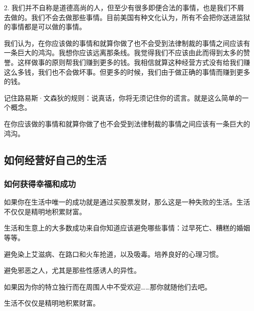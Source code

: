 2. 我们并不自称是道德高尚的人，但至少有很多即便合法的事情，也是我们不屑去做的。我们不会去做那些事情。目前美国有种文化认为，所有不会把你送进监狱的事情都是可以做的事情。
\par

我们认为，在你应该做的事情和就算你做了也不会受到法律制裁的事情之间应该有一条巨大的鸿沟。我想你应该远离那条线。我觉得我们不应该由此而得到太多的赞誉。这样做事的原则帮我们赚到更多的钱。我相信就算这种经营方式没有给我们赚这么多钱，我们也不会做坏事。但更多的时候，我们由于做正确的事情而赚到更多的钱。
\par

记住路易斯·文森狄的规则：说真话，你将无须记住你的谎言。就是这么简单的一个概念。
\par

\begin{WisdomBox}
\par

在你应该做的事情和就算你做了也不会受到法律制裁的事情之间应该有一条巨大的鸿沟。
\par
\end{WisdomBox}

\subsection*{如何经营好自己的生活}

\subsubsection*{如何获得幸福和成功}

如果你在生活中唯一的成功就是通过买股票发财，那么这是一种失败的生活。生活不仅仅是精明地积累财富。
\par

生活和生意上的大多数成功来自你知道应该避免哪些事情：过早死亡、糟糕的婚姻等等。
\par

避免染上艾滋病、在路口和火车抢道，以及吸毒。培养良好的心理习惯。
\par

避免邪恶之人，尤其是那些性感诱人的异性。
\par

如果因为你的特立独行而在周围人中不受欢迎……那你就随他们去吧。
\par

\begin{WisdomBox}
\par

生活不仅仅是精明地积累财富。
\par
\end{WisdomBox}

